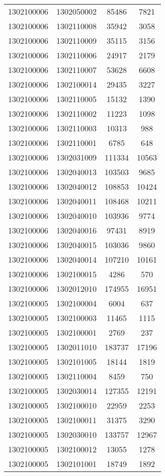 \begin{longtable}[h]{llcc}
		1302100006 & 1302050002 & 85486 & 7821\\
		1302100006 & 1302110008 & 35942 & 3058\\
		1302100006 & 1302110009 & 35115 & 3156\\
		1302100006 & 1302110006 & 24917 & 2179\\
		1302100006 & 1302110007 & 53628 & 6608\\
		1302100006 & 1302100014 & 29435 & 3227\\
		1302100006 & 1302110005 & 15132 & 1390\\
		1302100006 & 1302110002 & 11223 & 1098\\
		1302100006 & 1302110003 & 10313 & 988\\
		1302100006 & 1302110001 & 6785 & 648\\
		1302100006 & 1302031009 & 111334 & 10563\\
		1302100006 & 1302040013 & 103503 & 9685\\
		1302100006 & 1302040012 & 108853 & 10424\\
		1302100006 & 1302040011 & 108468 & 10211\\
		1302100006 & 1302040010 & 103936 & 9774\\
		1302100006 & 1302040016 & 97431 & 8919\\
		1302100006 & 1302040015 & 103036 & 9860\\
		1302100006 & 1302040014 & 107210 & 10161\\
		1302100006 & 1302100015 & 4286 & 570\\
		1302100006 & 1302012010 & 174955 & 16951\\
		1302100005 & 1302100004 & 6004 & 637\\
		1302100005 & 1302100003 & 11465 & 1115\\
		1302100005 & 1302100001 & 2769 & 237\\
		1302100005 & 1302011010 & 183737 & 17196\\
		1302100005 & 1302101005 & 18144 & 1819\\
		1302100005 & 1302110004 & 8459 & 750\\
		1302100005 & 1302030014 & 127355 & 12191\\
		1302100005 & 1302100010 & 22959 & 2253\\
		1302100005 & 1302100011 & 31375 & 3290\\
		1302100005 & 1302030010 & 133757 & 12967\\
		1302100005 & 1302100012 & 13055 & 1278\\
		1302100005 & 1302101001 & 18749 & 1892\\

\end{longtable}
